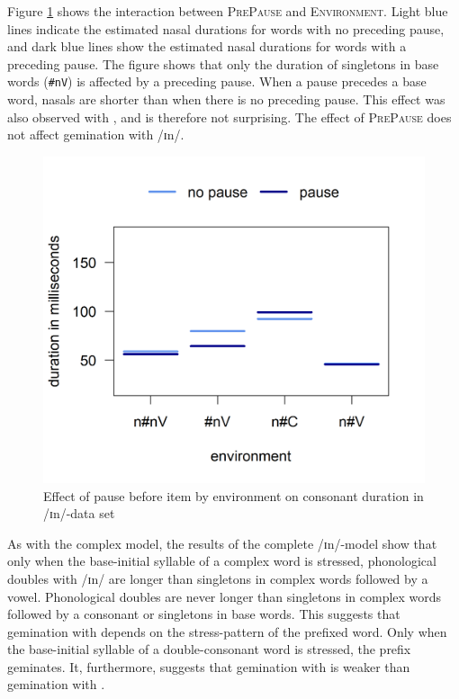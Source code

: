 
Figure \ref{fig:Env Pause In complete experiment} shows the interaction between \textsc{PrePause} and \textsc{Environment}. Light blue lines indicate the estimated nasal durations for words with no preceding pause, and dark blue lines show the estimated nasal durations for words with a preceding pause.
The figure shows that only the duration of singletons in base words (\texttt{\#nV}) is affected by a preceding pause. When a pause precedes a base word, nasals are shorter than when there is no preceding pause. This effect was also observed with , and is therefore not surprising. 
The effect of \textsc{PrePause} does not affect gemination with /ɪn/.



\begin{figure}[h!]
	\vspace*{-0.4cm}
	\centering
	
	\includegraphics [scale=0.5] {images/Experiment/InModelCompleteInterEnvPause}
	\caption{Effect of pause before item by environment on consonant duration in /ɪn/-data set}
	\label{fig:Env Pause In complete experiment}
\end{figure}	




As with the complex model, the results of the complete /ɪn/-model show that only when the base-initial syllable of a complex word is stressed, phonological doubles with /ɪn/ are longer than singletons in complex words followed by a vowel. 
Phonological doubles are never longer than singletons in complex words followed by a consonant or singletons in base words. 
This suggests that gemination with  depends on the stress-pattern of the prefixed word.  Only when the base-initial syllable of a double-consonant word is stressed, the prefix geminates. It, furthermore, suggests that gemination with  is weaker than gemination with .


